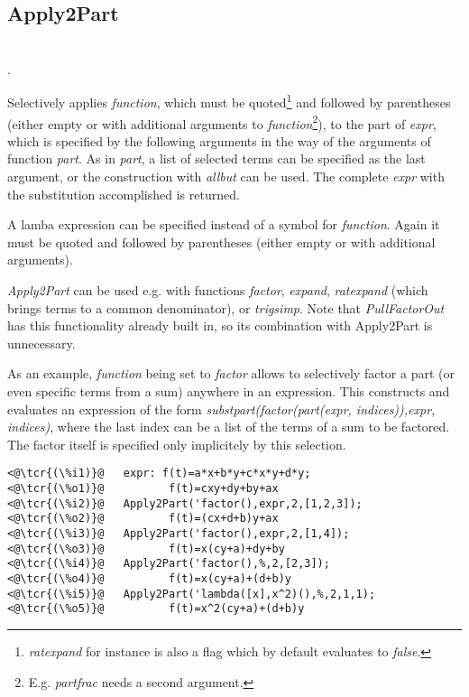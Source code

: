 \documentclass[../Maxima_Workbook.tex]{subfiles}
\begin{document}
\subsection{Apply2Part}

\lz {} \\
. \hfill {}

\lz Selectively applies \emph{function}, which must be quoted\footnote{\emph{ratexpand} for instance is also a flag which by default evaluates to \emph{false}.} and followed by parentheses (either empty or with additional arguments to \emph{function}\footnote{E.g. \emph{partfrac} needs a second argument.}), to the part of \emph{expr}, which is specified by the following arguments in the way of the arguments of function \emph{part}. As in \emph{part}, a list of selected terms can be specified as the last argument, or the construction with \emph{allbut} can be used. The complete \emph{expr} with the substitution accomplished is returned. 

\lz A lamba expression can be specified instead of a symbol for \emph{function}. Again it must be quoted and followed by parentheses (either empty or with additional arguments).

\lz \emph{Apply2Part} can be used e.g. with functions \emph{factor}, \emph{expand}, \emph{ratexpand} (which brings terms to a common denominator), or \emph{trigsimp}. Note that \emph{PullFactorOut} has this functionality already built in, so its combination with Apply2Part is unnecessary.

\lz As an example, \emph{function} being set to \emph{factor} allows to selectively factor a part (or even specific terms from a sum) anywhere in an expression. This constructs and evaluates an expression of the form \emph{substpart(factor(part(expr, indices)),expr, indices)}, where the last index can be a list of the terms of a sum to be factored. The factor itself is specified only implicitely by this selection.

\lzz \begin{small}
\color{blue}
\begin{lstlisting}
<@\tcr{(\%i1)}@   expr: f(t)=a*x+b*y+c*x*y+d*y;
<@\tcr{(\%o1)}@			 f(t)=cxy+dy+by+ax
<@\tcr{(\%i2)}@   Apply2Part('factor(),expr,2,[1,2,3]);
<@\tcr{(\%o2)}@			 f(t)=(cx+d+b)y+ax   
<@\tcr{(\%i3)}@   Apply2Part('factor(),expr,2,[1,4]);
<@\tcr{(\%o3)}@			 f(t)=x(cy+a)+dy+by
<@\tcr{(\%i4)}@   Apply2Part('factor(),%,2,[2,3]);
<@\tcr{(\%o4)}@			 f(t)=x(cy+a)+(d+b)y  
<@\tcr{(\%i5)}@   Apply2Part('lambda([x],x^2)(),%,2,1,1);
<@\tcr{(\%o5)}@			 f(t)=x^2(cy+a)+(d+b)y  
\end{lstlisting}
\color{black}
\end{small}
\end{document}
